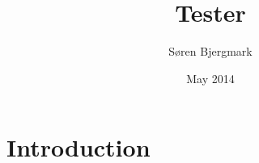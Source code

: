 \documentclass{article}
\title{Tester}
\author{Søren Bjergmark}
\date{May 2014}
\begin{document}
\maketitle

\section{Introduction}
\end{document}
